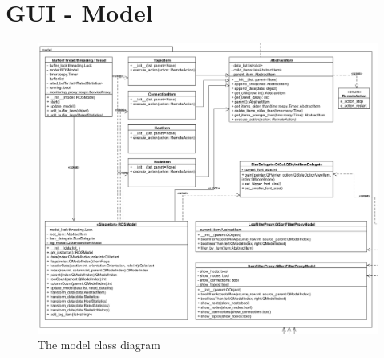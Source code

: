 \section{GUI - Model}
\begin{figure}[!ht]
\begin{center}
\includegraphics[width=1.0\linewidth]{./diagram_pictures/model.png}
\caption{The model class diagram}
\end{center}
\end{figure}

\newpage

